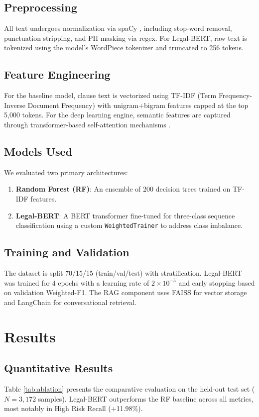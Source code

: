 \documentclass[conference]{IEEEtran}
\begin{document}
\subsection{Preprocessing}
All text undergoes normalization via spaCy \cite{spacy}, including stop-word removal, punctuation stripping, and PII masking via regex. For Legal-BERT, raw text is tokenized using the model's WordPiece tokenizer and truncated to 256 tokens.

\subsection{Feature Engineering}
For the baseline model, clause text is vectorized using TF-IDF (Term Frequency-Inverse Document Frequency) with unigram+bigram features capped at the top 5,000 tokens. For the deep learning engine, semantic features are captured through transformer-based self-attention mechanisms \cite{attention_is_all_you_need}.

\subsection{Models Used}
We evaluated two primary architectures:
\begin{enumerate}
    \item \textbf{Random Forest (RF)}: An ensemble of 200 decision trees trained on TF-IDF features.
    \item \textbf{Legal-BERT}: A BERT transformer fine-tuned for three-class sequence classification using a custom \texttt{WeightedTrainer} to address class imbalance.
\end{enumerate}

\subsection{Training and Validation}
The dataset is split 70/15/15 (train/val/test) with stratification. Legal-BERT was trained for 4 epochs with a learning rate of $2\times10^{-5}$ and early stopping based on validation Weighted-F1. The RAG component uses FAISS for vector storage and LangChain for conversational retrieval.

\section{Results}

\subsection{Quantitative Results}
Table \ref{tab:ablation} presents the comparative evaluation on the held-out test set ($N=3{,}172$ samples). Legal-BERT outperforms the RF baseline across all metrics, most notably in High Risk Recall (+11.98\%).
\end{document}
